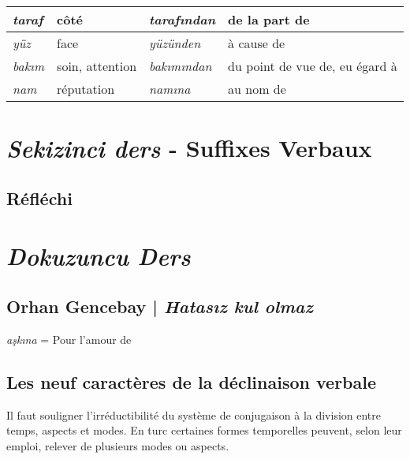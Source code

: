 \documentclass{cours}
\newcommand{\ch}{\c{s}}
\begin{document}
\begin{enumerate}
\begin{center}
\begin{tabular}{>{\sl}ll|>{\sl}ll}
                  \midrule
                  taraf   & côté            & taraf\i ndan   & de la part de                  \\
                  \midrule
                  yüz     & face            & yüzünden       & à cause de                     \\
                  \midrule
                  bak\i m & soin, attention & bak\i m\i ndan & du point de vue de, eu égard à \\
                  \midrule
                  nam     & réputation      & nam\i na       & au nom de                      \\
                  \bottomrule
              \end{tabular}
          \end{center}

\end{enumerate}

\section{\textsl{Sekizinci ders} - Suffixes Verbaux}
\subsection{Réfléchi}

\section{\textsl{Dokuzuncu Ders}}
\subsection{Orhan Gencebay | \textsl{Hatas\i z kul olmaz}}
\textsl{a\ch k\i na} = Pour l'amour de
\subsection{Les neuf caractères de la déclinaison verbale}
Il faut souligner l'irréductibilité du système de conjugaison à la division entre temps, aspects et modes. En turc certaines formes temporelles peuvent, selon leur emploi, relever de plusieurs modes ou aspects.
\end{document}
